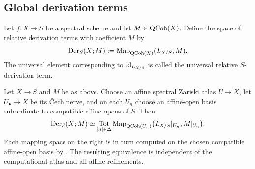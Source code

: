 \subsection{Global derivation terms}

\begin{definition}
\label{def:global-derivation-term}
Let \(f:X\to S\) be a spectral scheme and let \(M\in\operatorname{QCoh}(X)\). Define the
space of relative derivation terms with coefficient \(M\) by
\[
    \operatorname{Der}_S(X;M)
    :=
    \operatorname{Map}_{\operatorname{QCoh}(X)}(L_{X/S},M).
\]
The universal element corresponding to \(\operatorname{id}_{L_{X/S}}\) is called the
universal relative \(S\)-derivation term.
\end{definition}

\begin{proposition}
\label{prop:global-derivation-affine-computation}
Let \(X\to S\) and \(M\) be as above. Choose an affine spectral Zariski atlas
\(U\to X\), let \(U_\bullet\to X\) be its \v{C}ech nerve, and on each
\(U_n\) choose an affine-open basis subordinate to compatible affine opens of
\(S\). Then
\[
    \operatorname{Der}_S(X;M)
    \simeq
    \operatorname*{Tot}_{[n]\in\Delta}
    \operatorname{Map}_{\operatorname{QCoh}(U_n)}
    \bigl(L_{X/S}|_{U_n},M|_{U_n}\bigr).
\]
Each mapping space on the right is in turn computed on the chosen compatible
affine-open basis by . The resulting
equivalence is independent of the computational atlas and all affine
refinements.
\end{proposition}

